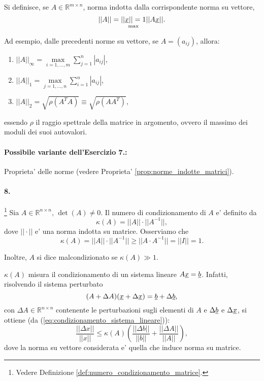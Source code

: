 Si definisce, se $A\in\mathbb{R}^{m\times n}$, norma indotta dalla corrispondente norma su vettore,
\begin{equation*}
	||A|| = \underset{\max}{||\uline x|| = 1}||A \uline x||.
\end{equation*}

Ad esempio, dalle precedenti norme su vettore, se $A=(a_{ij})$, allora:
\begin{enumerate}
	\item $||A||_\infty = \underset{i = 1, \hdots, m}{\max} \sum_{j=1}^{n}|a_{ij}|$,
	\item $||A||_1 = \underset{j = 1,\hdots, n}{\max}\sum_{i = 1}^{n}|a_{ij}|$,
	\item $||A||_2 =\sqrt{\rho(A^T A)} \equiv \sqrt{\rho (AA^T)}$,
\end{enumerate}
essendo $\rho$ il raggio spettrale della matrice in argomento, ovvero il massimo dei moduli dei suoi autovalori.

\paragraph{Possibile variante dell'Esercizio 7.:} Proprieta' delle norme (vedere Proprieta' \ref{prop:norme_indotte_matrici}).

\paragraph{8.}\footnote{Vedere Definizione \ref{def:numero_condizionamento_matrice}.} Sia $A\in\mathbb{R}^{n\times n},\, \det(A) \neq 0$. Il numero di condizionamento di $A$ e' definito da
\begin{equation*}
	\kappa(A) = ||A||\cdot||A^{-1}||,
\end{equation*}
dove $||\cdot||$ e' una norma indotta su matrice. Osserviamo che
\begin{equation*}
	\kappa(A) = ||A||\cdot||A^{-1}|| \geq ||A\cdot A^{-1}|| = ||I|| = 1.
\end{equation*}

Inoltre, $A$ si dice malcondizionato se $\kappa(A)\gg 1$.

$\kappa(A)$ misura il condizionamento di un sistema lineare $A\uline x = \uline b$. Infatti, risolvendo il sistema perturbato
\begin{equation*}
	(A+\Delta A) (\uline x + \Delta\uline x) = \uline b + \Delta\uline b,
\end{equation*}
con $\Delta A\in\mathbb{R}^{n\times n}$ contenente le perturbazioni sugli elementi di $A$ e $\Delta\uline b$ e $\Delta\uline x$, si ottiene (da (\ref{eq:condizionamento_sistema_lineare})):
\begin{equation*}
	 \frac{||\Delta x||}{||x||} \leq \kappa(A)\left(\frac{||\Delta b||}{||b||} + \frac{||\Delta A||}{||A||}\right),
\end{equation*}
dove la norma su vettore considerata e' quella che induce norma su matrice.

